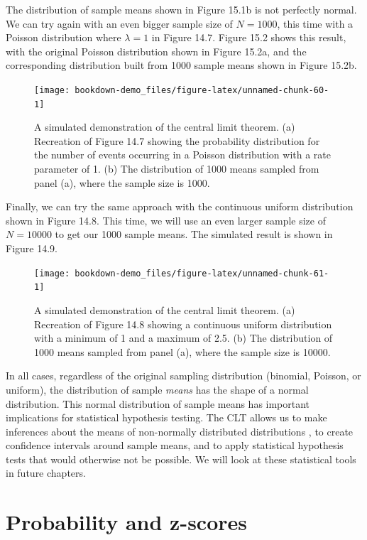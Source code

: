 \documentclass[
]{scrbook}
\begin{document}
The distribution of sample means shown in Figure 15.1b is not perfectly normal.
We can try again with an even bigger sample size of \(N = 1000\), this time with a Poisson distribution where \(\lambda = 1\) in Figure 14.7.
Figure 15.2 shows this result, with the original Poisson distribution shown in Figure 15.2a, and the corresponding distribution built from 1000 sample means shown in Figure 15.2b.

\begin{figure}
\texttt{[image: bookdown-demo\_files/figure-latex/unnamed-chunk-60-1]} \caption{A simulated demonstration of the central limit theorem. (a) Recreation of Figure 14.7 showing the probability distribution for the number of events occurring in a Poisson distribution with a rate parameter of 1. (b) The distribution of 1000 means sampled from panel (a), where the sample size is 1000.}\label{fig:unnamed-chunk-60}
\end{figure}

Finally, we can try the same approach with the continuous uniform distribution shown in Figure 14.8.
This time, we will use an even larger sample size of \(N = 10000\) to get our 1000 sample means.
The simulated result is shown in Figure 14.9.

\begin{figure}
\texttt{[image: bookdown-demo\_files/figure-latex/unnamed-chunk-61-1]} \caption{A simulated demonstration of the central limit theorem. (a) Recreation of Figure 14.8 showing a continuous uniform distribution with a minimum of 1 and a maximum of 2.5. (b) The distribution of 1000 means sampled from panel (a), where the sample size is 10000.}\label{fig:unnamed-chunk-61}
\end{figure}

In all cases, regardless of the original sampling distribution (binomial, Poisson, or uniform), the distribution of sample \emph{means} has the shape of a normal distribution.
This normal distribution of sample means has important implications for statistical hypothesis testing.
The CLT allows us to make inferences about the means of non-normally distributed distributions \citep{Sokal1995}, to create confidence intervals around sample means, and to apply statistical hypothesis tests that would otherwise not be possible.
We will look at these statistical tools in future chapters.

\hypertarget{probability-and-z-scores}{%
\section{Probability and z-scores}\label{probability-and-z-scores}}
\end{document}
